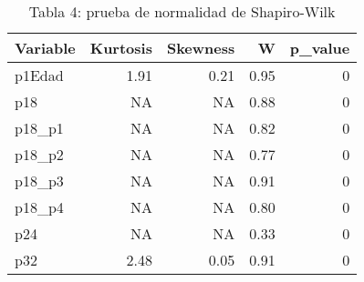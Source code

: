 \begin{table}

\caption{Tabla 4: prueba de normalidad de Shapiro-Wilk}
\centering
\begin{tabular}[t]{l|r|r|r|r}
\hline
Variable & Kurtosis & Skewness & W & p\_value\\
\hline
p1Edad & 1.91 & 0.21 & 0.95 & 0\\
\hline
p18 & NA & NA & 0.88 & 0\\
\hline
p18\_p1 & NA & NA & 0.82 & 0\\
\hline
p18\_p2 & NA & NA & 0.77 & 0\\
\hline
p18\_p3 & NA & NA & 0.91 & 0\\
\hline
p18\_p4 & NA & NA & 0.80 & 0\\
\hline
p24 & NA & NA & 0.33 & 0\\
\hline
p32 & 2.48 & 0.05 & 0.91 & 0\\
\hline
\end{tabular}
\end{table}
